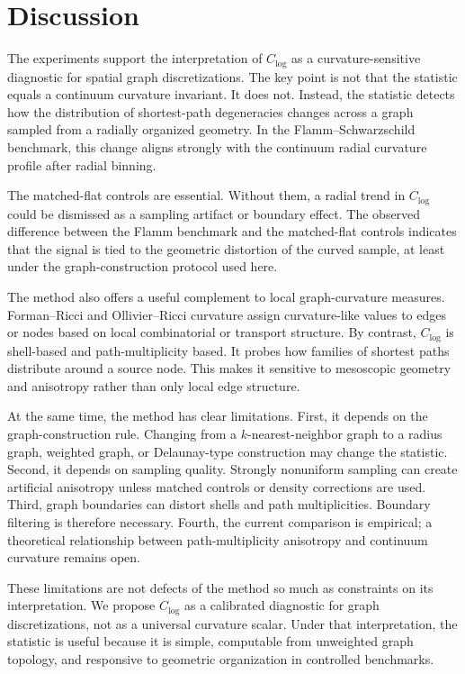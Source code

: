\documentclass{svproc}
\begin{document}
\section{Discussion}

The experiments support the interpretation of $C_{\log}$ as a curvature-sensitive diagnostic for spatial graph discretizations. The key point is not that the statistic equals a continuum curvature invariant. It does not. Instead, the statistic detects how the distribution of shortest-path degeneracies changes across a graph sampled from a radially organized geometry. In the Flamm--Schwarzschild benchmark, this change aligns strongly with the continuum radial curvature profile after radial binning.

The matched-flat controls are essential. Without them, a radial trend in $C_{\log}$ could be dismissed as a sampling artifact or boundary effect. The observed difference between the Flamm benchmark and the matched-flat controls indicates that the signal is tied to the geometric distortion of the curved sample, at least under the graph-construction protocol used here.

The method also offers a useful complement to local graph-curvature measures. Forman--Ricci and Ollivier--Ricci curvature assign curvature-like values to edges or nodes based on local combinatorial or transport structure. By contrast, $C_{\log}$ is shell-based and path-multiplicity based. It probes how families of shortest paths distribute around a source node. This makes it sensitive to mesoscopic geometry and anisotropy rather than only local edge structure.

At the same time, the method has clear limitations. First, it depends on the graph-construction rule. Changing from a $k$-nearest-neighbor graph to a radius graph, weighted graph, or Delaunay-type construction may change the statistic. Second, it depends on sampling quality. Strongly nonuniform sampling can create artificial anisotropy unless matched controls or density corrections are used. Third, graph boundaries can distort shells and path multiplicities. Boundary filtering is therefore necessary. Fourth, the current comparison is empirical; a theoretical relationship between path-multiplicity anisotropy and continuum curvature remains open.

These limitations are not defects of the method so much as constraints on its interpretation. We propose $C_{\log}$ as a calibrated diagnostic for graph discretizations, not as a universal curvature scalar. Under that interpretation, the statistic is useful because it is simple, computable from unweighted graph topology, and responsive to geometric organization in controlled benchmarks.
\end{document}

